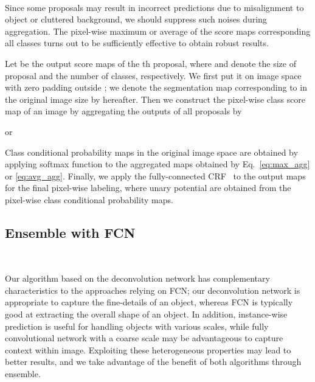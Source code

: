 \documentclass[10pt,twocolumn,letterpaper]{article}
\begin{document}
\ifdefined{} \\ \fi
Since some proposals may result in incorrect predictions due to misalignment to object or cluttered background, we should suppress such noises during aggregation.
The pixel-wise maximum or average of the score maps corresponding all classes turns out to be sufficiently effective to obtain robust results.

Let  be the output score maps of the th proposal, where  and  denote the size of proposal and the number of classes, respectively.
We first put it on image space with zero padding outside ; we denote the segmentation map corresponding to  in the original image size by  hereafter. 
Then we construct the pixel-wise class score map of an image by aggregating the outputs of all proposals by

or



Class conditional probability maps in the original image space are obtained by applying softmax function to the aggregated maps obtained by Eq.~\eqref{eq:max_agg} or \eqref{eq:avg_agg}.
Finally, we apply the fully-connected CRF~\cite{Fullycrf} to the output maps for the final pixel-wise labeling, where unary potential are obtained from the pixel-wise class conditional probability maps.


\subsection{Ensemble with FCN}
\label{sec:ensemble}
\ifdefined{} \\ \fi
\iffalse
As described earlier, the proposed semantic segmentation algorithm based on deconvolution network and instance-wise prediction has very different characteristics compared to approaches based on FCN.
\fi
Our algorithm based on the deconvolution network has complementary characteristics to the approaches relying on FCN; our deconvolution network is appropriate to capture the fine-details of an object, whereas FCN is typically good at extracting the overall shape of an object.
In addition, instance-wise prediction is useful for handling objects with various scales, while fully convolutional network with a coarse scale may be advantageous to capture context within image.
Exploiting these heterogeneous properties may lead to better results, and we take advantage of the benefit of both algorithms through ensemble.
\end{document}
